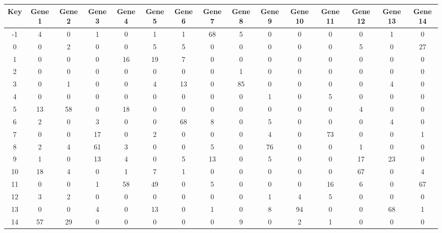 \begin{tabular}{|c|c|c|c|c|c|c|c|c|c|c|c|c|c|c|}
\hline
Key & Gene 1 & Gene 2 & Gene 3 & Gene 4 & Gene 5 & Gene 6 & Gene 7 & Gene 8 & Gene 9 & Gene 10 & Gene 11 & Gene 12 & Gene 13 & Gene 14 \\
\hline
-1 & 4 & 0 & 1 & 0 & 1 & 1 & 68 & 5 & 0 & 0 & 0 & 0 & 1 & 0 \\
0 & 0 & 2 & 0 & 0 & 5 & 5 & 0 & 0 & 0 & 0 & 0 & 5 & 0 & 27 \\
1 & 0 & 0 & 0 & 16 & 19 & 7 & 0 & 0 & 0 & 0 & 0 & 0 & 0 & 0 \\
2 & 0 & 0 & 0 & 0 & 0 & 0 & 0 & 1 & 0 & 0 & 0 & 0 & 0 & 0 \\
3 & 0 & 1 & 0 & 0 & 4 & 13 & 0 & 85 & 0 & 0 & 0 & 0 & 4 & 0 \\
4 & 0 & 0 & 0 & 0 & 0 & 0 & 0 & 0 & 1 & 0 & 5 & 0 & 0 & 0 \\
5 & 13 & 58 & 0 & 18 & 0 & 0 & 0 & 0 & 0 & 0 & 0 & 4 & 0 & 0 \\
6 & 2 & 0 & 3 & 0 & 0 & 68 & 8 & 0 & 5 & 0 & 0 & 0 & 4 & 0 \\
7 & 0 & 0 & 17 & 0 & 2 & 0 & 0 & 0 & 4 & 0 & 73 & 0 & 0 & 1 \\
8 & 2 & 4 & 61 & 3 & 0 & 0 & 5 & 0 & 76 & 0 & 0 & 1 & 0 & 0 \\
9 & 1 & 0 & 13 & 4 & 0 & 5 & 13 & 0 & 5 & 0 & 0 & 17 & 23 & 0 \\
10 & 18 & 4 & 0 & 1 & 7 & 1 & 0 & 0 & 0 & 0 & 0 & 67 & 0 & 4 \\
11 & 0 & 0 & 1 & 58 & 49 & 0 & 5 & 0 & 0 & 0 & 16 & 6 & 0 & 67 \\
12 & 3 & 2 & 0 & 0 & 0 & 0 & 0 & 0 & 1 & 4 & 5 & 0 & 0 & 0 \\
13 & 0 & 0 & 4 & 0 & 13 & 0 & 1 & 0 & 8 & 94 & 0 & 0 & 68 & 1 \\
14 & 57 & 29 & 0 & 0 & 0 & 0 & 0 & 9 & 0 & 2 & 1 & 0 & 0 & 0 \\
\hline
\end{tabular}